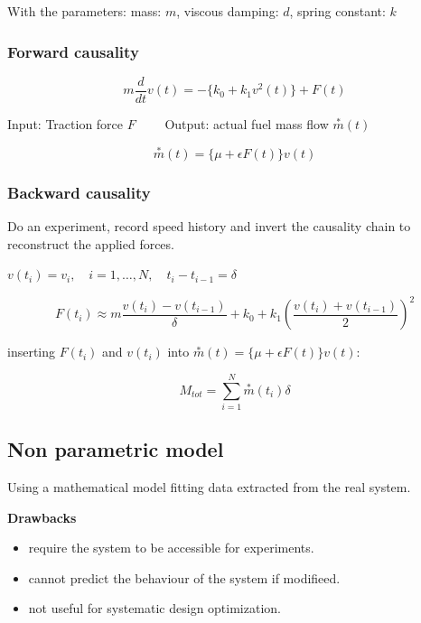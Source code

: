 \documentclass[10pt,a4paper]{scrartcl}
\begin{document}
\begin{multicols*}{3}


With the parameters: mass: $m$, viscous damping: $d$, spring constant: $k$

\subsubsection{Forward causality}


\begin{equation*}
m\frac{d}{dt}v(t)=-\{k_0+k_1v^2(t)\}+F(t)
\end{equation*}

\small
Input: Traction force $F\qquad$ Output: actual fuel mass flow $\overset{\ast}{m}(t)$\normalsize

\begin{equation*}
\overset{\ast}{m}(t)=\{\mu+\epsilon F(t)\}v(t)
\end{equation*}

\subsubsection{Backward causality}

Do an experiment, record speed history and invert the causality chain to reconstruct the applied forces.


$v(t_i)=v_i,\quad i=1,\ldots,N,\quad t_i-t_{i-1}=\delta$

\begin{equation*}F(t_i)\approx m\frac{v(t_i)-v(t_{i-1})}{\delta}+k_0+k_1\left(\frac{v(t_i)+v(t_{i-1})}{2}\right)^2
\end{equation*}

inserting $F(t_i)$ and $v(t_i)$ into $\overset{\ast}{m}(t)=\{\mu+\epsilon F(t)\}v(t)$:

\begin{equation*}
M_{tot}=\sum\limits_{i=1}^N\overset{\ast}{m}(t_i)\delta
\end{equation*}


\subsection{Non parametric model}

Using a mathematical model fitting data extracted from the real system.

\textbf{Drawbacks}
\begin{itemize}
\item require the system to be accessible for experiments.
\item cannot predict the behaviour of the system if modifieed.
\item not useful for systematic design optimization.
\end{itemize}


\end{multicols*}
\end{document}
